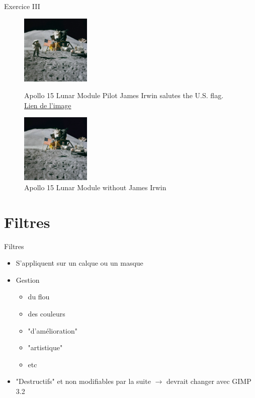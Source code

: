 \documentclass[10pt,svgnames,usenames,table]{beamer}
\begin{document}
	\begin{frame}{Exercice III}
	
		\begin{figure}[H]
			\centering
			\begin{minipage}{.5\textwidth}
				\centering
				\includegraphics[height=125px]{Images/purge/Apollo_15_flag,_rover,_LM,_Irwin}
				\caption{\tiny{Apollo 15 Lunar Module Pilot James Irwin salutes the U.S. flag.\\\href{http://louvainlinux.github.io/atelier-gimp/src/Images/purge/Apollo_15_flag,_rover,_LM,_Irwin.jpg}{Lien de l'image}}}
			\end{minipage}%
			\begin{minipage}{.5\textwidth}
				\centering
				\includegraphics[height=125px]{Images/purge/Apollo_15_flag,_rover,_LM}
				\caption{\tiny{Apollo 15 Lunar Module without James Irwin}}
			\end{minipage}
		\end{figure}	
	\end{frame}



\section{Filtres}
	\begin{frame}{Filtres}
		\begin{itemize}
			\item S'appliquent sur un calque ou un masque
			\item Gestion 
				\begin{itemize}
				\item du flou
				\item des couleurs
				\item "d'amélioration"
				\item "artistique"
				\item etc
				\end{itemize}
			\item "Destructifs" et non modifiables par la suite $\rightarrow$ devrait changer avec GIMP 3.2
		\end{itemize}
	\end{frame}
\end{document}
